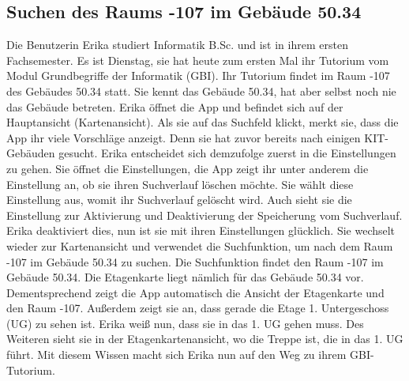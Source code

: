 \subsection{Suchen des Raums -107 im Gebäude 50.34}

Die \Gls{Benutzer}in Erika studiert Informatik B.Sc. und ist in ihrem ersten Fachsemester.
Es ist Dienstag, sie hat heute zum ersten Mal ihr Tutorium vom Modul Grundbegriffe der Informatik (GBI).
Ihr Tutorium findet im Raum -107 des Gebäudes 50.34 statt.
Sie kennt das Gebäude 50.34, hat aber selbst noch nie das Gebäude betreten.
Erika öffnet die App und befindet sich auf der Hauptansicht (\Gls{Kartenansicht}).
Als sie auf das \Gls{Suchfeld} klickt, merkt sie, dass die App ihr viele Vorschläge anzeigt.
Denn sie hat zuvor bereits nach einigen \Gls{KIT}-Gebäuden gesucht.
Erika entscheidet sich demzufolge zuerst in die Einstellungen zu gehen.
Sie öffnet die Einstellungen, die App zeigt ihr unter anderem die Einstellung an, ob sie ihren \Gls{Suchverlauf} löschen möchte.
Sie wählt diese Einstellung aus, womit ihr \Gls{Suchverlauf} gelöscht wird.
Auch sieht sie die Einstellung zur Aktivierung und Deaktivierung der Speicherung vom \Gls{Suchverlauf}.
Erika deaktiviert dies, nun ist sie mit ihren Einstellungen glücklich.
Sie wechselt wieder zur \Gls{Kartenansicht} und verwendet die Suchfunktion, um nach dem Raum -107 im Gebäude 50.34 zu suchen.
Die Suchfunktion findet den Raum -107 im Gebäude 50.34.
Die \Gls{Etagenkarte} liegt nämlich für das Gebäude 50.34 vor.
Dementsprechend zeigt die App automatisch die Ansicht der \Gls{Etagenkarte} und den Raum -107.
Außerdem zeigt sie an, dass gerade die Etage 1. Untergeschoss (UG) zu sehen ist.
Erika weiß nun, dass sie in das 1. UG gehen muss.
Des Weiteren sieht sie in der \Gls{Etagenkartenansicht}, wo die Treppe ist, die in das 1. UG führt.
Mit diesem Wissen macht sich Erika nun auf den Weg zu ihrem GBI-Tutorium.